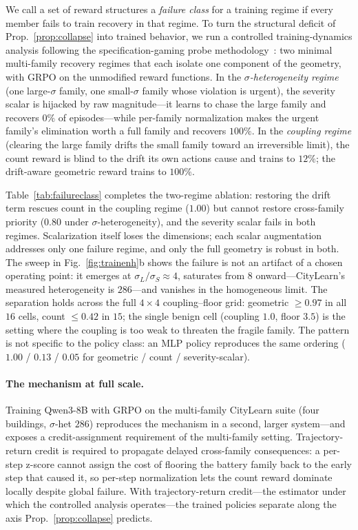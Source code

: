 We call a set of reward structures a \emph{failure class} for a training regime if every member fails to train recovery in that regime. To turn the structural deficit of Prop.~\ref{prop:collapse} into trained behavior, we run a controlled training-dynamics analysis following the specification-gaming probe methodology~\cite{krakovna2020specification}: two minimal multi-family recovery regimes that each isolate one component of the geometry, with GRPO on the unmodified reward functions. In the \emph{$\sigma$-heterogeneity regime} (one large-$\sigma$ family, one small-$\sigma$ family whose violation is urgent), the severity scalar is hijacked by raw magnitude---it learns to chase the large family and recovers $0\%$ of episodes---while per-family normalization makes the urgent family's elimination worth a full family and recovers $100\%$. In the \emph{coupling regime} (clearing the large family drifts the small family toward an irreversible limit), the count reward is blind to the drift its own actions cause and trains to $12\%$; the drift-aware geometric reward trains to $100\%$.

Table~\ref{tab:failureclass} completes the two-regime ablation: restoring the drift term rescues count in the coupling regime ($1.00$) but cannot restore cross-family priority ($0.80$ under $\sigma$-heterogeneity), and the severity scalar fails in both regimes. Scalarization itself loses the dimensions; each scalar augmentation addresses only one failure regime, and only the full geometry is robust in both. The sweep in Fig.~\ref{fig:trainenh}b shows the failure is not an artifact of a chosen operating point: it emerges at $\sigma_L/\sigma_S\!\approx\!4$, saturates from $8$ onward---CityLearn's measured heterogeneity is $286$---and vanishes in the homogeneous limit. The separation holds across the full $4{\times}4$ coupling--floor grid: geometric ${\ge}0.97$ in all $16$ cells, count ${\le}0.42$ in $15$; the single benign cell (coupling $1.0$, floor $3.5$) is the setting where the coupling is too weak to threaten the fragile family. The pattern is not specific to the policy class: an MLP policy reproduces the same ordering ($1.00$ / $0.13$ / $0.05$ for geometric / count / severity-scalar).

\paragraph{The mechanism at full scale.}
Training Qwen3-8B with GRPO on the multi-family CityLearn suite (four buildings, $\sigma$-het $286$) reproduces the mechanism in a second, larger system---and exposes a credit-assignment requirement of the multi-family setting. Trajectory-return credit is required to propagate delayed cross-family consequences: a per-step z-score cannot assign the cost of flooring the battery family back to the early step that caused it, so per-step normalization lets the count reward dominate locally despite global failure. With trajectory-return credit---the estimator under which the controlled analysis operates---the trained policies separate along the axis Prop.~\ref{prop:collapse} predicts.

